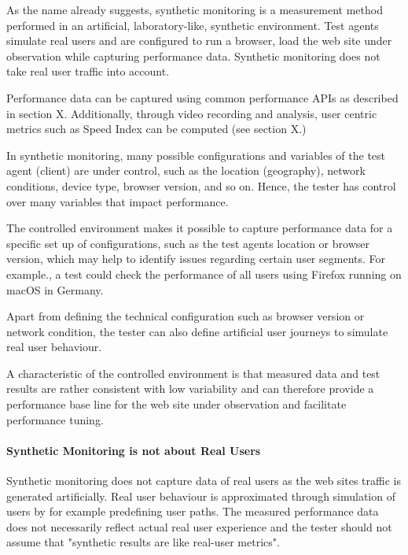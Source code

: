 As the name already suggests, synthetic monitoring is a measurement method performed in an artificial, laboratory-like, synthetic environment.
Test agents simulate real users and are configured to run a browser, load the web site under observation while capturing performance data.
Synthetic monitoring does not take real user traffic into account. %

Performance data can be captured using common performance APIs as described in section X.
Additionally, through video recording and analysis,  user centric metrics such as Speed Index can be computed (see section X.) %

In synthetic monitoring, many possible configurations and variables of the test agent (client) are under control, such as the location (geography), network conditions, device type, browser version, and so on. %
Hence, the tester has control over many variables that impact performance. %

The controlled environment makes it possible to capture performance data for a specific set up of configurations, such as the test agents location or browser version, which may help to identify issues regarding certain user segments.  For example., a test could check the performance of all users using Firefox running on macOS in Germany. %

Apart from defining the technical configuration such as browser version or network condition, the tester can also define artificial user journeys to simulate real user behaviour. %

A characteristic of the controlled environment is that measured data and test results are rather consistent with low variability and can therefore provide a performance base line for the web site under observation and facilitate performance tuning.%


\paragraph{Synthetic Monitoring is not about Real Users}

Synthetic monitoring does not capture data of real users as the web sites traffic is generated artificially.
Real user behaviour is approximated through simulation of users by for example predefining user paths.
The measured performance data does not necessarily reflect actual real user experience and the tester should not assume that "synthetic results are like real-user metrics". %

